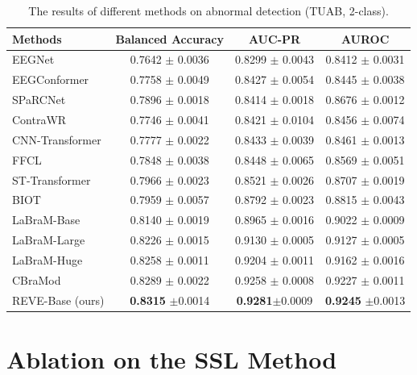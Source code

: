 \documentclass{article}
\begin{document}
\begin{table}[H]
\centering
\small
\caption{The results of different methods on abnormal detection (TUAB, 2-class).}
\begin{tabular}{lccc} 
\toprule
\textbf{Methods} & \textbf{Balanced Accuracy} & \textbf{AUC-PR} & \textbf{AUROC} \\
\midrule
EEGNet            & 0.7642 $\pm$ 0.0036 & 0.8299 $\pm$ 0.0043 & 0.8412 $\pm$ 0.0031 \\
EEGConformer      & 0.7758 $\pm$ 0.0049 & 0.8427 $\pm$ 0.0054 & 0.8445 $\pm$ 0.0038 \\
SPaRCNet          & 0.7896 $\pm$ 0.0018 & 0.8414 $\pm$ 0.0018 & 0.8676 $\pm$ 0.0012 \\
ContraWR          & 0.7746 $\pm$ 0.0041 & 0.8421 $\pm$ 0.0104 & 0.8456 $\pm$ 0.0074 \\
CNN-Transformer   & 0.7777 $\pm$ 0.0022 & 0.8433 $\pm$ 0.0039 & 0.8461 $\pm$ 0.0013 \\
FFCL              & 0.7848 $\pm$ 0.0038 & 0.8448 $\pm$ 0.0065 & 0.8569 $\pm$ 0.0051 \\
ST-Transformer    & 0.7966 $\pm$ 0.0023 & 0.8521 $\pm$ 0.0026 & 0.8707 $\pm$ 0.0019 \\
\midrule
BIOT              & 0.7959 $\pm$ 0.0057 & 0.8792 $\pm$ 0.0023 & 0.8815 $\pm$ 0.0043 \\
LaBraM-Base       & 0.8140 $\pm$ 0.0019 & 0.8965 $\pm$ 0.0016 & 0.9022 $\pm$ 0.0009 \\
LaBraM-Large      & 0.8226 $\pm$ 0.0015 & 0.9130 $\pm$ 0.0005 & 0.9127 $\pm$ 0.0005 \\
LaBraM-Huge       & 0.8258 $\pm$ 0.0011 & 0.9204 $\pm$ 0.0011 & 0.9162 $\pm$ 0.0016 \\
CBraMod                  & 0.8289 $\pm$ 0.0022 & 0.9258 $\pm$ 0.0008 & 0.9227 $\pm$ 0.0011 \\
\midrule
REVE-Base (ours) & \textbf{0.8315} $\pm$0.0014 & \textbf{0.9281}$\pm$0.0009& \textbf{0.9245 }$\pm$0.0013\\
\bottomrule
\end{tabular}
\label{tab:Abnormal}
\end{table}





\section{Ablation on the SSL Method}
\label{app:ablationssl}
\end{document}
